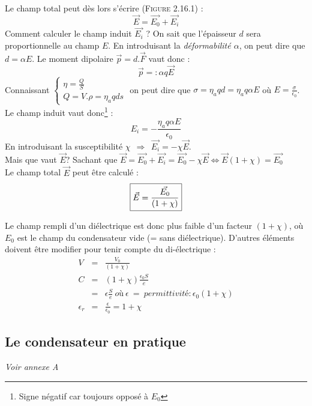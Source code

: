 \documentclass	[11pt, a4paper, openany]{book}
\begin{document}
Le champ total peut dès lors s'écrire (\textsc{Figure 2.16.1}) :
\begin{equation}
\vec{E} = \vec{E_0} + \vec{E_i}
\end{equation}
Comment calculer le champ induit $\vec{E_i}$ ? On sait que l'épaisseur $d$ sera proportionnelle au champ $E$. En introduisant la \textit{déformabilité $\alpha$}, on peut dire que $d = \alpha E$. Le moment dipolaire $\vec{p} = d.\vec{F}$ vaut donc :
\begin{equation}
\vec{p} =: \alpha q\vec{E}
\end{equation}
Connaissant $\left\{\begin{array}{l}
\eta = \frac{Q}{S}\\
Q = V.\rho = \eta_a q d s
\end{array}\right.$ on peut dire que $\sigma = \eta_a q d = \eta_a q \alpha E$ où $E = \frac{\sigma}{\epsilon_0}$.
Le champ induit vaut donc\footnote{Signe négatif car toujours opposé à $E_0$} :
\begin{equation}
E_i = -\frac{\eta_a q \alpha E}{\epsilon_0}
\end{equation}
En introduisant la susceptibilité $\chi\ \ \Rightarrow\ \ \vec{E_i} = -\chi \vec{E}$.\\
Mais que vaut $\vec{E}$? Sachant que $\vec{E} = \vec{E_0} + \vec{E_i} = \vec{E_0} - \chi \vec{E} \Leftrightarrow \vec{E}(1+\chi) = \vec{E_0}$\\
Le champ total $\vec{E}$ peut être calculé :
\begin{equation}
\fbox{$\vec{E} = \dfrac{\vec{E_0}}{(1+\chi)}$}
\end{equation}

Le champ rempli d'un diélectrique est donc plus faible d'un facteur $(1+\chi)$, où $E_0$ est le champ du condensateur vide (= sans diélectrique). D'autres éléments doivent être modifier pour tenir compte du di-électrique :
\begin{eqnarray}
V &=& \frac{V_0}{(1+\chi)}\\
C &=& (1+\chi)\frac{\epsilon_0 S}{e}\\
 &=& \epsilon \frac{S}{e}\ où\ \epsilon\ =\ permittivité : \epsilon_0(1+\chi)\\
\epsilon_r &=& \frac{\epsilon}{\epsilon_0} = 1+\chi
\end{eqnarray}

\subsection{Le condensateur en pratique}
\textit{Voir annexe A}
\end{document}

